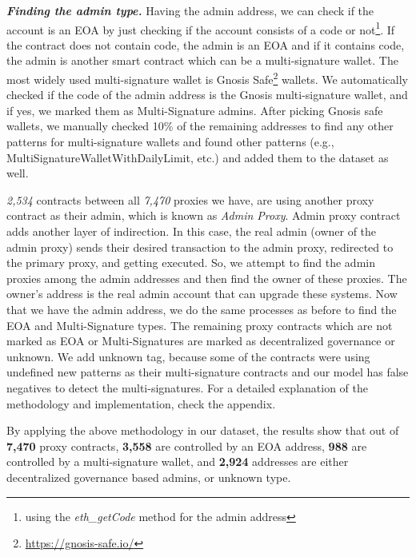 \textbf{\emph{Finding the admin type.}} Having the admin address, we can check if the account is an EOA by just checking if the account consists of a code or not\footnote{using the \textit{eth\_getCode} method for the admin address}. If the contract does not contain code, the admin is an EOA and if it contains code, the admin is another smart contract which can be a multi-signature wallet. The most widely used multi-signature wallet is Gnosis Safe\footnote{\url{https://gnosis-safe.io/}} wallets. We automatically checked if the code of the admin address is the Gnosis multi-signature wallet, and if yes, we marked them as Multi-Signature admins. After picking Gnosis safe wallets, we manually checked 10\% of the remaining addresses to find any other patterns for multi-signature wallets and found other patterns (e.g., MultiSignatureWalletWithDailyLimit, etc.) and added them to the dataset as well. 

\textit{2,534} contracts between all \textit{7,470} proxies we have, are using another proxy contract as their admin, which is known as \textit{Admin Proxy}. Admin proxy contract adds another layer of indirection. In this case, the real admin (owner of the admin proxy) sends their desired transaction to the admin proxy, redirected to the primary proxy, and getting executed. So, we attempt to find the admin proxies among the admin addresses and then find the owner of these proxies. The owner's address is the real admin account that can upgrade these systems. Now that we have the admin address, we do the same processes as before to find the EOA and Multi-Signature types.
The remaining proxy contracts which are not marked as EOA or Multi-Signatures are marked as decentralized governance or unknown. We add unknown tag, because some of the contracts were using undefined new patterns as their multi-signature contracts and our model has false negatives to detect the multi-signatures. 
For a detailed explanation of the methodology and implementation, check the appendix.


By applying the above methodology in our dataset, the results show that out of \textbf{7,470} proxy contracts, \textbf{3,558} are controlled by an EOA address, \textbf{988} are controlled by a multi-signature wallet, and \textbf{2,924} addresses are either decentralized governance based admins, or unknown type.

